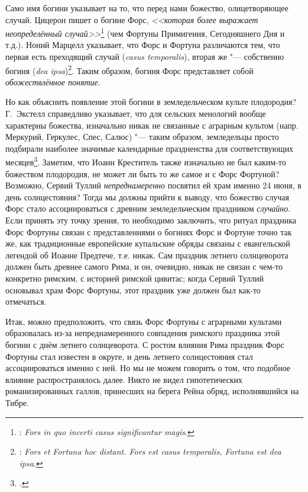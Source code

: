 Само имя богини указывает на то, что перед нами божество, олицетворяющее случай. Цицерон пишет о богине Форс, \textit{<<которая более выражает неопределённый случай>>}\footnote{: \textit{Fors in quo incerti casus significantur magis}.} (чем Фортуны Примигения, Сегодняшнего Дня и т.д.). Ноний Марцелл указывает, что Форс и Фортуна различаются тем, что первая есть преходящий случай (\textit{casus temporalis}), вторая же "--- собственно богиня (\textit{dea ipsa})\footnote{: \textit{Fors et Fortuna hoc distant. Fors est casus temporalis, Fortuna est dea ipsa}.}. Таким образом, богиня Форс представляет собой \textit{обожествлённое понятие}.

Но как объяснить появление этой богини в земледельческом культе плодородия? Г.~Экстелл справедливо указывает, что для сельских менологий вообще характерны божества, изначально никак не связанные с аграрным культом (напр. Меркурий, Геркулес, Спес, Салюс) "--- таким образом, земледельцы просто подбирали наиболее значимые календарные праздненства для соответствующих месяцев\footcite[P. 10]{Axtell1907}. Заметим, что Иоанн Креститель также изначально не был каким-то божеством плодородия, не может ли быть то же самое и с Форс Фортуной? Возможно, Сервий Туллий \textit{непреднамеренно} посвятил ей храм именно 24 июня, в день солнцестояния? Тогда мы должны прийти к выводу, что божество случая Форс стало ассоциироваться с древним земледельческим праздником \textit{случайно}. Если принять эту точку зрения, то необходимо заключить, что ритуал праздника Форс Фортуны связан с представлениями о богинях Форс и Фортуне точно так же, как традиционные европейские купальские обряды связаны с евангельской легендой об Иоанне Предтече, т.е. никак. Сам праздник летнего солнцеворота должен быть древнее самого Рима, и он, очевидно, никак не связан с чем-то конкретно римским, с историей римской цивитас; когда Сервий Туллий основывал храм Форс Фортуны, этот праздник уже должен был как-то отмечаться.

Итак, можно предположить, что связь Форс Фортуны с аграрными культами образовалась из-за непреднамеренного совпадения римского праздника этой богини с днём летнего солнцеворота. С ростом влияния Рима праздник Форс Фортуны стал известен в округе, и день летнего солнцестояния стал ассоциироваться именно с ней. Но мы не можем говорить о том, что подобное влияние распространялось далее. Никто не видел гипотетических романизированных галлов, принесших на берега Рейна обряд, исполнявшийся на Тибре.

